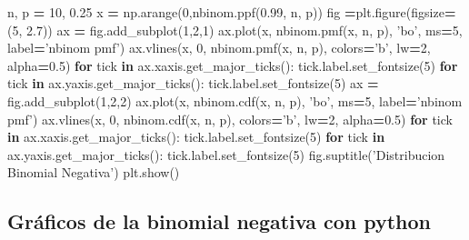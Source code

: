 \documentclass[]{book}
\newenvironment{Shaded}{\begin{snugshade}}{\end{snugshade}}
\newcommand{\ControlFlowTok}[1]{\textcolor[rgb]{0.13,0.29,0.53}{\textbf{#1}}}
\newcommand{\DecValTok}[1]{\textcolor[rgb]{0.00,0.00,0.81}{#1}}
\newcommand{\FloatTok}[1]{\textcolor[rgb]{0.00,0.00,0.81}{#1}}
\newcommand{\KeywordTok}[1]{\textcolor[rgb]{0.13,0.29,0.53}{\textbf{#1}}}
\newcommand{\NormalTok}[1]{#1}
\newcommand{\OperatorTok}[1]{\textcolor[rgb]{0.81,0.36,0.00}{\textbf{#1}}}
\newcommand{\StringTok}[1]{\textcolor[rgb]{0.31,0.60,0.02}{#1}}
\begin{document}
\begin{Shaded}
\begin{Highlighting}[]
\NormalTok{n, p }\OperatorTok{=} \DecValTok{10}\NormalTok{, }\FloatTok{0.25}
\NormalTok{x }\OperatorTok{=}\NormalTok{ np.arange(}\DecValTok{0}\NormalTok{,nbinom.ppf(}\FloatTok{0.99}\NormalTok{, n, p))}
\NormalTok{fig }\OperatorTok{=}\NormalTok{plt.figure(figsize}\OperatorTok{=}\NormalTok{(}\DecValTok{5}\NormalTok{, }\FloatTok{2.7}\NormalTok{))}
\NormalTok{ax }\OperatorTok{=}\NormalTok{ fig.add_subplot(}\DecValTok{1}\NormalTok{,}\DecValTok{2}\NormalTok{,}\DecValTok{1}\NormalTok{)}
\NormalTok{ax.plot(x, nbinom.pmf(x, n, p), }\StringTok{'bo'}\NormalTok{, ms}\OperatorTok{=}\DecValTok{5}\NormalTok{, label}\OperatorTok{=}\StringTok{'nbinom pmf'}\NormalTok{)}
\NormalTok{ax.vlines(x, }\DecValTok{0}\NormalTok{, nbinom.pmf(x, n, p), colors}\OperatorTok{=}\StringTok{'b'}\NormalTok{, lw}\OperatorTok{=}\DecValTok{2}\NormalTok{, alpha}\OperatorTok{=}\FloatTok{0.5}\NormalTok{)}
\ControlFlowTok{for}\NormalTok{ tick }\KeywordTok{in}\NormalTok{ ax.xaxis.get_major_ticks():}
\NormalTok{  tick.label.set_fontsize(}\DecValTok{5}\NormalTok{)}
\ControlFlowTok{for}\NormalTok{ tick }\KeywordTok{in}\NormalTok{ ax.yaxis.get_major_ticks():}
\NormalTok{  tick.label.set_fontsize(}\DecValTok{5}\NormalTok{) }
\NormalTok{ax }\OperatorTok{=}\NormalTok{ fig.add_subplot(}\DecValTok{1}\NormalTok{,}\DecValTok{2}\NormalTok{,}\DecValTok{2}\NormalTok{)}
\NormalTok{ax.plot(x, nbinom.cdf(x, n, p), }\StringTok{'bo'}\NormalTok{, ms}\OperatorTok{=}\DecValTok{5}\NormalTok{, label}\OperatorTok{=}\StringTok{'nbinom pmf'}\NormalTok{)}
\NormalTok{ax.vlines(x, }\DecValTok{0}\NormalTok{, nbinom.cdf(x, n, p), colors}\OperatorTok{=}\StringTok{'b'}\NormalTok{, lw}\OperatorTok{=}\DecValTok{2}\NormalTok{, alpha}\OperatorTok{=}\FloatTok{0.5}\NormalTok{)}
\ControlFlowTok{for}\NormalTok{ tick }\KeywordTok{in}\NormalTok{ ax.xaxis.get_major_ticks():}
\NormalTok{  tick.label.set_fontsize(}\DecValTok{5}\NormalTok{)}
\ControlFlowTok{for}\NormalTok{ tick }\KeywordTok{in}\NormalTok{ ax.yaxis.get_major_ticks():}
\NormalTok{  tick.label.set_fontsize(}\DecValTok{5}\NormalTok{)}
\NormalTok{fig.suptitle(}\StringTok{'Distribucion Binomial Negativa'}\NormalTok{)}
\NormalTok{plt.show()}
\end{Highlighting}
\end{Shaded}

\hypertarget{gruxe1ficos-de-la-binomial-negativa-con-python-2}{%
\subsection{Gráficos de la binomial negativa con python}\label{gruxe1ficos-de-la-binomial-negativa-con-python-2}}
\end{document}

